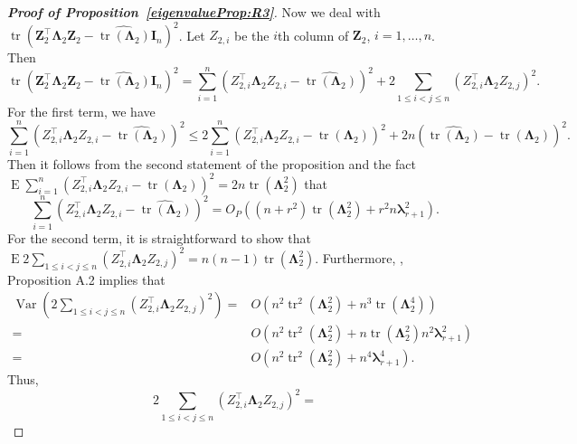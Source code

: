 \documentclass[10pt]{book}
\theoremstyle{definition}
\DeclareMathOperator{\mytr}{tr}
\DeclareMathOperator{\myE}{E}
\DeclareMathOperator{\myVar}{Var}
\newcommand{\bZ}{\mathbf{Z}}
\newcommand{\bI}{\mathbf{I}}
\newcommand{\bfsym}[1]{\ensuremath{\boldsymbol{#1}}}
\def\blambda {\bfsym {\lambda}}
\def\bLambda {\bfsym {\Lambda}}
\begin{document}
\begin{proof}[\textbf{Proof of Proposition~\ref{eigenvalueProp:R3}}]
    Now we deal with $\mytr(\bZ_2^\top \bLambda_2 \bZ_2-\widehat{\mytr(\bLambda_2)}\bI_n)^2$.
    Let $Z_{2,i}$ be the $i$th column of $\bZ_2$, $i=1,\ldots, n$.
    Then
    \begin{equation*}
        \mytr(\bZ_2^\top \bLambda_2 \bZ_2-\widehat{\mytr(\bLambda_2)}\bI_n)^2
        =
        \sum_{i=1}^n (Z_{2,i}^\top \bLambda_2 Z_{2,i}-\widehat{\mytr(\bLambda_2)})^2
        +
        2\sum_{1\leq i<j\leq n} (Z_{2,i}^\top \bLambda_2 Z_{2,j})^2.
    \end{equation*}
    For the first term, we have 
    \begin{equation*}
        \sum_{i=1}^n (Z_{2,i}^\top \bLambda_2 Z_{2,i}-\widehat{\mytr(\bLambda_2)})^2
        \leq
        2\sum_{i=1}^n (Z_{2,i}^\top \bLambda_2 Z_{2,i}-\mytr(\bLambda_2))^2
        +2n(\widehat{\mytr(\bLambda_2)}-\mytr(\bLambda_2))^2.
    \end{equation*}
    Then it follows from the second statement of the proposition and the fact $
        \myE
        \sum_{i=1}^n (Z_{2,i}^\top \bLambda_2 Z_{2,i}-\mytr(\bLambda_2))^2
        =2n \mytr(\bLambda_2^2)
        $ that
        \begin{equation}\label{abcd1}
        \sum_{i=1}^n (Z_{2,i}^\top \bLambda_2 Z_{2,i}-\widehat{\mytr(\bLambda_2)})^2
        =O_P\left((n+r^2)\mytr(\bLambda_2^2)+r^2 n \blambda_{r+1}^2\right).
\end{equation}
    For the second term, it is straightforward to show that
    $\myE 2\sum_{1\leq i<j\leq n} (Z_{2,i}^\top \bLambda_2 Z_{2,j})^2=n(n-1)\mytr(\bLambda_2^2)$.
    Furthermore, \cite{chen2010tests}, Proposition A.2 implies that
    \begin{equation*}
        \begin{split}
        \myVar\left(
            2\sum_{1\leq i<j\leq n} (Z_{2,i}^\top \bLambda_2 Z_{2,j})^2
        \right)
        =& O\left(
            n^2 \mytr^2 (\bLambda_2^2) + n^3 \mytr(\bLambda_2^4)
        \right)
        \\
        =& O\left(
            n^2 \mytr^2 (\bLambda_2^2) + n \mytr(\bLambda_{2}^2) n^2 \blambda_{r+1}^2
        \right)
        \\
        =& O\left(
            n^2 \mytr^2 (\bLambda_2^2) + n^4 \blambda_{r+1}^4
        \right)
        .
        \end{split}
    \end{equation*}
    Thus,
    \begin{equation*}
            2\sum_{1\leq i<j\leq n} (Z_{2,i}^\top \bLambda_2 Z_{2,j})^2
            =

\end{equation*}
\end{proof}
\end{document}
